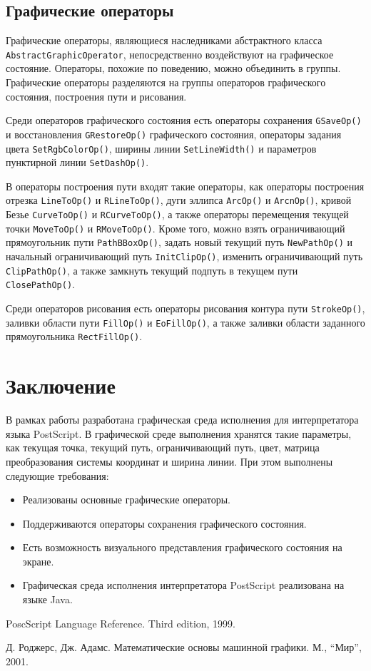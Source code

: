\subsection{Графические операторы}
\sloppy

Графические операторы, являющиеся наследниками абстрактного класса \texttt{AbstractGraphicOperator}, непосредственно воздействуют на графическое состояние.
Операторы, похожие по поведению, можно объединить в группы. Графические операторы разделяются на группы операторов графического состояния, построения пути и рисования. 

Среди операторов графического состояния есть операторы сохранения \texttt{GSaveOp()} и восстановления \texttt{GRestoreOp()} графического состояния, операторы задания цвета \texttt{SetRgbColorOp()}, ширины линии \texttt{SetLineWidth()} и параметров пунктирной линии \texttt{SetDashOp()}.

В операторы построения пути входят такие операторы, как операторы построения отрезка \texttt{LineToOp()} и \texttt{RLineToOp()}, дуги эллипса \texttt{ArcOp()} и \texttt{ArcnOp()}, кривой Безье \texttt{CurveToOp()} и \texttt{RCurveToOp()}, а также операторы перемещения текущей точки \texttt{MoveToOp()} и \texttt{RMoveToOp()}. Кроме того, можно взять ограничивающий прямоугольник пути \texttt{PathBBoxOp()}, задать новый текущий путь \texttt{NewPathOp()} и начальный ограничивающий путь \texttt{InitClipOp()}, изменить ограничивающий путь \texttt{ClipPathOp()}, а также замкнуть текущий подпуть в текущем пути \texttt{ClosePathOp()}.

Среди операторов рисования есть операторы рисования контура пути \texttt{StrokeOp()}, заливки области пути \texttt{FillOp()} и \texttt{EoFillOp()}, а также заливки области заданного прямоугольника \texttt{RectFillOp()}. 


\section*{Заключение}

В рамках работы разработана графическая среда исполнения для интерпретатора языка PostScript. В графической среде выполнения хранятся такие параметры, как текущая точка, текущий путь, ограничивающий путь,  цвет,  матрица преобразования системы координат и ширина линии. 
При этом выполнены следующие требования:
\begin{itemize}
\item Реализованы основные графические операторы.
\item Поддерживаются операторы сохранения графического состояния.
\item Есть возможность визуального представления графического состояния на 
    экране.
\item Графическая среда исполнения интерпретатора PostScript реализована на языке Java.
\end{itemize}


\begin{thebibliography}{99}
PoscScript Language Reference. Third edition, 1999.

Д. Роджерс, Дж. Адамс. Математические основы машинной графики. М., ``Мир'', 2001. 
\end{thebibliography}

